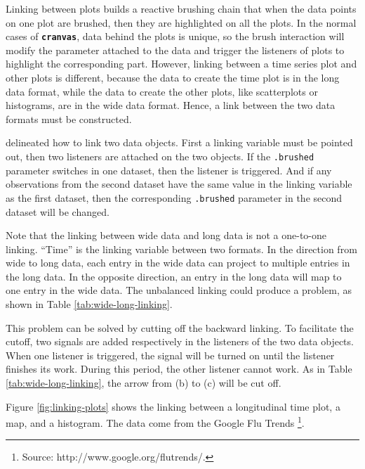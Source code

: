 \documentclass[12pt]{article}
\begin{document}
Linking between plots builds a reactive brushing chain that
when the data points on one plot are brushed, then they are
highlighted on all the plots. In the normal cases of
\texttt{\textbf{cranvas}}, data behind the plots is unique,
so the brush interaction will modify the parameter attached
to the data and trigger the listeners of plots to highlight
the corresponding part. However, linking between a time
series plot and other plots is different, because the
data to create the time plot is in the long data format,
while the data to create the other plots, like scatterplots
or histograms, are in the wide data format. Hence, a link
between the two data formats must be constructed.

\citet{xie2014reactive} delineated how to link two data
objects. First a linking variable must be pointed out, then two listeners
are attached on the two objects. If the \texttt{.brushed} parameter
switches in one dataset, then the listener is triggered. And if any
observations from the second dataset have the same value in the linking
variable as the first dataset, then the corresponding \texttt{.brushed}
parameter in the second dataset will be changed. 

Note that the linking between wide data and long data is not a one-to-one
linking. ``Time'' is the linking variable between two formats.
In the direction from wide to long data, each entry in the
wide data can project to multiple entries in the long data. In the
opposite direction, an entry in the long data will map to one entry in
the wide data. The unbalanced linking could produce a problem, as
shown in Table \ref{tab:wide-long-linking}.

This problem can be solved by cutting off the backward linking.
To facilitate the cutoff, two signals are added respectively
in the listeners of the two data objects. When one listener
is triggered, the signal will be turned on until the listener
finishes its work. During this period, the other listener cannot work.
As in Table \ref{tab:wide-long-linking}, the arrow from  (b) to  (c)
will be cut off.

Figure \ref{fig:linking-plots} shows the linking between
a longitudinal time plot, a map, and a histogram. The data
come from the Google Flu Trends
\footnote{Source: http://www.google.org/flutrends/.}.
\end{document}
